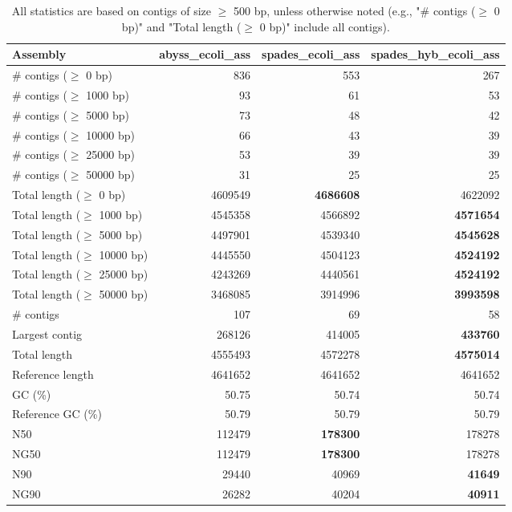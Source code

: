 \documentclass[12pt,a4paper]{article}
\begin{document}
\begin{table}[ht]
\begin{center}
\caption{All statistics are based on contigs of size $\geq$ 500 bp, unless otherwise noted (e.g., "\# contigs ($\geq$ 0 bp)" and "Total length ($\geq$ 0 bp)" include all contigs).}
\begin{tabular}{|l*{3}{|r}|}
\hline
Assembly & abyss\_ecoli\_ass & spades\_ecoli\_ass & spades\_hyb\_ecoli\_ass \\ \hline
\# contigs ($\geq$ 0 bp) & 836 & 553 & 267 \\ \hline
\# contigs ($\geq$ 1000 bp) & 93 & 61 & 53 \\ \hline
\# contigs ($\geq$ 5000 bp) & 73 & 48 & 42 \\ \hline
\# contigs ($\geq$ 10000 bp) & 66 & 43 & 39 \\ \hline
\# contigs ($\geq$ 25000 bp) & 53 & 39 & 39 \\ \hline
\# contigs ($\geq$ 50000 bp) & 31 & 25 & 25 \\ \hline
Total length ($\geq$ 0 bp) & 4609549 & {\bf 4686608} & 4622092 \\ \hline
Total length ($\geq$ 1000 bp) & 4545358 & 4566892 & {\bf 4571654} \\ \hline
Total length ($\geq$ 5000 bp) & 4497901 & 4539340 & {\bf 4545628} \\ \hline
Total length ($\geq$ 10000 bp) & 4445550 & 4504123 & {\bf 4524192} \\ \hline
Total length ($\geq$ 25000 bp) & 4243269 & 4440561 & {\bf 4524192} \\ \hline
Total length ($\geq$ 50000 bp) & 3468085 & 3914996 & {\bf 3993598} \\ \hline
\# contigs & 107 & 69 & 58 \\ \hline
Largest contig & 268126 & 414005 & {\bf 433760} \\ \hline
Total length & 4555493 & 4572278 & {\bf 4575014} \\ \hline
Reference length & 4641652 & 4641652 & 4641652 \\ \hline
GC (\%) & 50.75 & 50.74 & 50.74 \\ \hline
Reference GC (\%) & 50.79 & 50.79 & 50.79 \\ \hline
N50 & 112479 & {\bf 178300} & 178278 \\ \hline
NG50 & 112479 & {\bf 178300} & 178278 \\ \hline
N90 & 29440 & 40969 & {\bf 41649} \\ \hline
NG90 & 26282 & 40204 & {\bf 40911} \\ \hline

\end{tabular}
\end{center}
\end{table}
\end{document}
